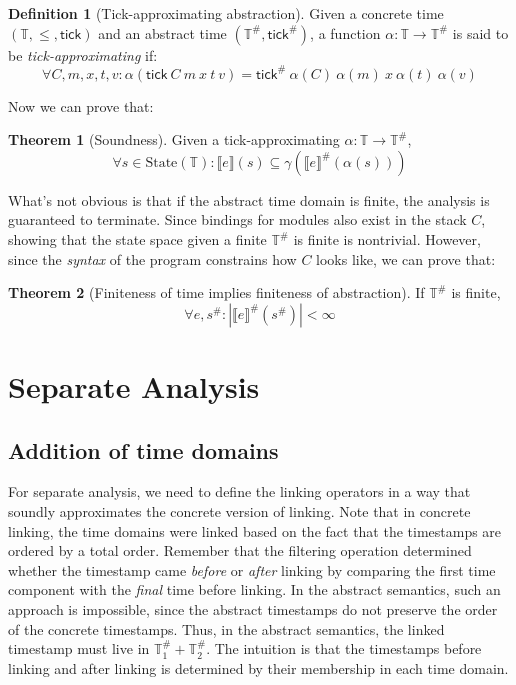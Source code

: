 \documentclass[acmsmall,review]{acmart}\settopmatter{printfolios=true,printccs=false,printacmref=false}
\theoremstyle{definition}
\newtheorem{definition}{Definition}[section]
\newtheorem{thm}{Theorem}[section]
\newcommand*{\A}[1]{{#1}^{\#}}
\newcommand*{\Time}{\mathbb{T}}
\newcommand*{\ATime}{\A{\Time}}
\newcommand*{\mem}{m}
\newcommand*{\State}{\text{State}}
\newcommand*{\sembracket}[1]{\lBrack{#1}\rBrack}
\newcommand*{\tick}{\mathsf{tick}}
\begin{document}
\begin{definition}[Tick-approximating abstraction]
  Given a concrete time $(\Time,\le,\tick)$ and an abstract time $(\ATime, \A\tick)$, a function $\alpha:\Time\rightarrow\ATime$ is said to be \emph{tick-approximating} if:
  \[
    \forall C,\mem,x,t,v:\alpha(\tick\:C\:\mem\:x\:t\:v)=\A\tick\:\alpha(C)\:\alpha(\mem)\:x\:\alpha(t)\:\alpha(v)
  \]
\end{definition}

Now we can prove that:
\begin{thm}[Soundness]
  Given a tick-approximating $\alpha:\Time\rightarrow\ATime$,
  \[
    \forall s\in\State(\Time):\sembracket{e}(s)\subseteq\gamma(\A{\sembracket{e}}(\alpha(s)))
  \]
\end{thm}

What's not obvious is that if the abstract time domain is finite, the analysis is guaranteed to terminate.
Since bindings for modules also exist in the stack $C$, showing that the state space given a finite $\ATime$ is finite is nontrivial.
However, since the \emph{syntax} of the program constrains how $C$ looks like, we can prove that:

\begin{thm}[Finiteness of time implies finiteness of abstraction]
  If $\ATime$ is finite,
  \[
    \forall e,\A{s}: |\A{\sembracket{e}}(\A{s})|<\infty
  \]
\end{thm}

\section{Separate Analysis}

\subsection{Addition of time domains}
For separate analysis, we need to define the linking operators in a way that soundly approximates the concrete version of linking.
Note that in concrete linking, the time domains were linked based on the fact that the timestamps are ordered by a total order.
Remember that the filtering operation determined whether the timestamp came \emph{before} or \emph{after} linking by comparing the first time component with the \emph{final} time before linking.
In the abstract semantics, such an approach is impossible, since the abstract timestamps do not preserve the order of the concrete timestamps.
Thus, in the abstract semantics, the linked timestamp must live in $\ATime_1+\ATime_2$.
The intuition is that the timestamps before linking and after linking is determined by their membership in each time domain.
\end{document}
